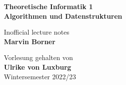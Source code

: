 \begin{titlepage}
	\begin{center}
		\vspace*{1cm}

		{\huge\textbf{Theoretische Informatik 1\bigskip\\Algorithmen und Datenstrukturen}}

		\vspace{0.5cm}
		{\Large Inofficial lecture notes}\\
		\textbf{Marvin Borner}

		\vfill

		Vorlesung gehalten von\\
		\textbf{Ulrike von Luxburg}\\
		Wintersemester 2022/23
	\end{center}
\end{titlepage}
